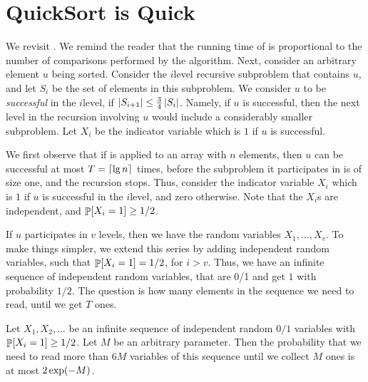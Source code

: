\makeatletter
{}
\makeatother
\ifx\bookMode\undefined%
\fi
{}

\ChapterPrefix{}
\ChapterGen{}


\section{QuickSort{} is Quick}

We revisit \QuickSort{}. We remind the reader that the running time of
\QuickSort{} is proportional to the number of comparisons performed by
the algorithm. Next, consider an arbitrary element $u$ being
sorted. Consider the $i$\th level recursive subproblem that contains $u$,
and let $S_i$ be the set of elements in this subproblem. We consider $u$
to be \emph{successful} in the $i$\th level, if
$\left| {S_{i+1}} \right| \leq \tfrac{3}{4}\left| {S_i} \right|$. Namely, if $u$ is
successful, then the next level in the recursion involving $u$ would
include a considerably smaller subproblem. Let $X_i$ be the indicator
variable which is $1$ if $u$ is successful.

We first observe that if \QuickSort{} is applied to an array with $n$
elements, then $u$ can be successful at most $T = \left\lceil {\lg n} \right\rceil$ times,
before the subproblem it participates in is of size one, and the
recursion stops. Thus, consider the indicator variable $X_i$ which is $1$
if $u$ is successful in the $i$\th level, and zero otherwise. Note that
the $X_i$s are independent, and $\Prob{X_i = 1} \geq 1/2$.%

If $u$ participates in $v$ levels, then we have the random variables
$X_1, \ldots, X_v$. To make things simpler, we extend this
series by adding independent random variables, such that
$\Prob{X_i=1}=1/2$, for $i > v$. Thus, we have an infinite sequence
of independent random variables, that are 0/1 and get $1$ with
probability $1/2$. The question is how many elements in the sequence
we need to read, until we get $T$ ones.

\begin{lemma}
    Let $X_1, X_2,\ldots$ be an infinite sequence of independent random
    $0/1$ variables with $\Prob{X_i = 1} \geq 1/2$. Let $M$ be an arbitrary
    parameter. Then the probability that we need to read more than $6M$
    variables of this sequence until we collect $M$ ones is at most
    $2\exp \pth{- M}$.
\end{lemma}

